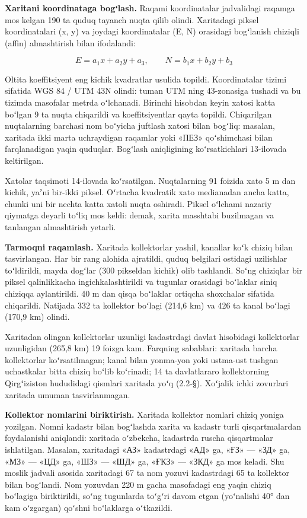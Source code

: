 \documentclass[14pt,a4paper,oneside]{extreport}
\begin{document}
\textbf{Xaritani koordinataga bogʻlash.} Raqami koordinatalar
jadvalidagi raqamga mos kelgan 190 ta quduq tayanch nuqta qilib olindi.
Xaritadagi piksel koordinatalari (x, y) va joydagi koordinatalar (E, N)
orasidagi bogʻlanish chiziqli (affin) almashtirish bilan ifodalandi:

\begin{equation}\tag{2.2}
E = a_1 x + a_2 y + a_3, \qquad N = b_1 x + b_2 y + b_3
\end{equation}

Oltita koeffitsiyent eng kichik kvadratlar usulida topildi.
Koordinatalar tizimi sifatida WGS 84 / UTM 43N olindi: tuman UTM ning
43-zonasiga tushadi va bu tizimda masofalar metrda oʻlchanadi. Birinchi
hisobdan keyin xatosi katta boʻlgan 9 ta nuqta chiqarildi va
koeffitsiyentlar qayta topildi. Chiqarilgan nuqtalarning barchasi nom
boʻyicha juftlash xatosi bilan bogʻliq: masalan, xaritada ikki marta
uchraydigan raqamlar yoki «ПЕЗ» qoʻshimchasi bilan farqlanadigan yaqin
quduqlar. Bogʻlash aniqligining koʻrsatkichlari 13-ilovada keltirilgan.

Xatolar taqsimoti 14-ilovada koʻrsatilgan. Nuqtalarning 91 foizida xato
5 m dan kichik, yaʼni bir-ikki piksel. Oʻrtacha kvadratik xato
medianadan ancha katta, chunki uni bir nechta katta xatoli nuqta
oshiradi. Piksel oʻlchami nazariy qiymatga deyarli toʻliq mos keldi:
demak, xarita masshtabi buzilmagan va tanlangan almashtirish yetarli.

\textbf{Tarmoqni raqamlash.} Xaritada kollektorlar yashil, kanallar koʻk
chiziq bilan tasvirlangan. Har bir rang alohida ajratildi, quduq
belgilari ostidagi uzilishlar toʻldirildi, mayda dogʻlar (300 pikseldan
kichik) olib tashlandi. Soʻng chiziqlar bir piksel qalinlikkacha
ingichkalashtirildi va tugunlar orasidagi boʻlaklar siniq chiziqqa
aylantirildi. 40 m dan qisqa boʻlaklar ortiqcha shoxchalar sifatida
chiqarildi. Natijada 332 ta kollektor boʻlagi (214,6 km) va 426 ta kanal
boʻlagi (170,9 km) olindi.

Xaritadan olingan kollektorlar uzunligi kadastrdagi davlat hisobidagi
kollektorlar uzunligidan (265,8 km) 19 foizga kam. Farqning sabablari:
xaritada barcha kollektorlar koʻrsatilmagan; kanal bilan yonma-yon yoki
ustma-ust tushgan uchastkalar bitta chiziq boʻlib koʻrinadi; 14 ta
davlatlararo kollektorning Qirgʻiziston hududidagi qismlari xaritada
yoʻq (2.2-§). Xoʻjalik ichki zovurlari xaritada umuman tasvirlanmagan.

\textbf{Kollektor nomlarini biriktirish.} Xaritada kollektor nomlari
chiziq yoniga yozilgan. Nomni kadastr bilan bogʻlashda xarita va kadastr
turli qisqartmalardan foydalanishi aniqlandi: xaritada oʻzbekcha,
kadastrda ruscha qisqartmalar ishlatilgan. Masalan, xaritadagi «АЗ»
kadastrdagi «АД» ga, «ҒЗ» --- «ЗД» ga, «МЗ» --- «ЦД» ga, «ШЗ» --- «ШД»
ga, «ҒКЗ» --- «ЗКД» ga mos keladi. Shu moslik jadvali asosida xaritadagi
67 ta nom yozuvi kadastrdagi 65 ta kollektor bilan bogʻlandi. Nom
yozuvdan 220 m gacha masofadagi eng yaqin chiziq boʻlagiga biriktirildi,
soʻng tugunlarda toʻgʻri davom etgan (yoʻnalishi 40° dan kam oʻzgargan)
qoʻshni boʻlaklarga oʻtkazildi.
\end{document}
